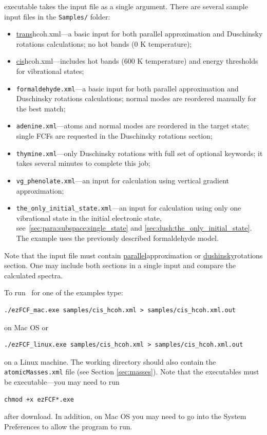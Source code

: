 \documentclass[11pt]{article}
\begin{document}
\ezFCF{} executable takes the input \xml file as a single argument. 
There are several sample input \xml files in the {\tt Samples/} folder:
\begin{itemize}
\item \ul{trans}{hcoh.xml}---a basic input for both parallel approximation and Duschinsky rotations calculations; 
no hot bands (0 K temperature); 
\item \ul{cis}{hcoh.xml}---includes hot bands (600 K temperature) and energy thresholds for vibrational states;
\item {\tt formaldehyde.xml}---a basic input for both parallel approximation and Duschinsky rotations calculations;
normal modes are reordered manually for the best match;
\item {\tt adenine.xml}---atoms and normal modes are reordered in the target state; single FCFs are requested 
in the Duschinsky rotations section;
\item {\tt thymine.xml}---only Duschinsky rotations with full set of optional keywords; 
it takes several minutes to complete this job;
\item {\tt vg\_phenolate.xml}---an input for calculation using vertical gradient approximation;
\item {\tt the\_only\_initial\_state.xml}---an input for calculation using only one vibrational state in the initial electronic state, see~\ref{sec:para:subspace:single_state} and \ref{sec:dush:the_only_initial_state}. The example uses the previously described formaldehyde model.
\end{itemize}
Note that the input file must contain \ul{parallel}{approximation} or \ul{dushinsky}{rotations} section.
One may include both sections in a single input and compare the calculated spectra.

To run \ezFCF\ for one of the examples type:
\begin{lstlisting}[frame=single,framerule=0pt]
  ./ezFCF_mac.exe samples/cis_hcoh.xml > samples/cis_hcoh.xml.out
\end{lstlisting}
on Mac OS or
\begin{lstlisting}[frame=single,framerule=0pt]
  ./ezFCF_linux.exe samples/cis_hcoh.xml > samples/cis_hcoh.xml.out
\end{lstlisting}
on a Linux machine. The working directory should also contain the {\tt atomicMasses.xml} file (see Section \ref{sec:masses}). Note that the executables must be executable---you may need to run
\begin{lstlisting}[frame=single,framerule=0pt]
  chmod +x ezFCF*.exe
\end{lstlisting}
after download. In addition, on Mac OS you may need to go into the System Preferences to allow the program to run. 
\end{document}
